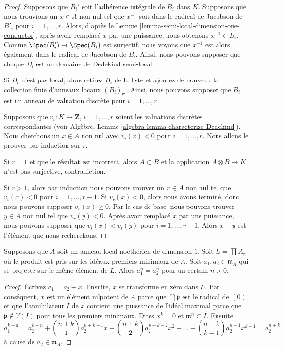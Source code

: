 \begin{proof}
Supposons que $B_i'$ soit l'adhérence intégrale de $B_i$ dans $K$.
Supposons que nous trouvions un $x \in A$ non nul tel que $x^{-1}$ soit
dans le radical de Jacobson de $B'_i$ pour $i = 1, \ldots, r$. Alors,
d'après le Lemme \ref{lemma-semi-local-dimension-one-conductor}, après
avoir remplacé $x$ par une puissance, nous obtenons $x^{-1} \in B_i$.
Comme $\Spec(B'_i) \to \Spec(B_i)$ est surjectif, nous voyons que
$x^{-1}$ est alors également dans le radical de Jacobson de $B_i$. Ainsi,
nous pouvons supposer que chaque $B_i$ est un domaine de Dedekind semi-local.

\medskip\noindent
Si $B_i$ n'est pas local, alors retirez $B_i$ de la liste
et ajoutez de nouveau la collection finie d'anneaux locaux
$(B_i)_\mathfrak m$. Ainsi, nous pouvons supposer que $B_i$
est un anneau de valuation discrète pour $i = 1, \ldots, r$.

\medskip\noindent
Supposons que $v_i : K \to \mathbf{Z}$, $i = 1, \ldots, r$
soient les valuations discrètes correspondantes (voir
Algèbre, Lemme \ref{algebra-lemma-characterize-Dedekind}).
Nous cherchons un $x \in A$ non nul avec $v_i(x) < 0$ pour $i
= 1, \ldots, r$. Nous allons le prouver par induction sur $r$.

\medskip\noindent
Si $r = 1$ et que le résultat est incorrect, alors $A \subset B$ et la
application $A \otimes B \to K$ n'est pas surjective, contradiction.

\medskip\noindent
Si $r > 1$, alors par induction nous pouvons trouver un $x \in A$ non nul
tel que $v_i(x) < 0$ pour $i = 1, \ldots, r - 1$. Si $v_r(x) < 0$, alors nous
avons terminé, donc nous pouvons supposer $v_r(x) \geq 0$. Par le cas de
base, nous pouvons trouver $y \in A$ non nul tel que $v_r(y) < 0$. Après avoir
remplacé $x$ par une puissance, nous pouvons supposer que $v_i(x) < v_i(y)$
pour $i = 1, \ldots, r - 1$. Alors $x + y$ est l'élément que nous recherchons.
\end{proof}

\begin{lemma}
\label{lemma-power-equal}
Supposons que $A$ soit un anneau local noethérien de
dimension $1$. Soit $L = \prod A_\mathfrak p$ où le
produit est pris sur les idéaux premiers minimaux de $A$.
Soit $a_1, a_2 \in \mathfrak m_A$ qui se projette sur le même
élément de $L$. Alors $a_1^n = a_2^n$ pour un certain $n > 0$.
\end{lemma}

\begin{proof}
Écrivez $a_1 = a_2 + x$. Ensuite, $x$ se transforme en zéro
dans $L$. Par conséquent, $x$ est un élément nilpotent de $A$
parce que $\bigcap \mathfrak p$ est le radical de $(0)$ et que
l’annihilateur $I$ de $x$ contient une puissance de l’idéal
maximal parce que $\mathfrak p \not \in V(I)$ pour tous les
premiers minimaux. Dites $x^k = 0$ et $\mathfrak m^n \subset I$. Ensuite
$$
a_1^{k + n} = a_2^{k + n} + {n + k \choose 1} a_2^{n + k - 1} x +
{n + k \choose 2} a_2^{n + k - 2} x^2 + \ldots +
{n + k \choose k - 1} a_2^{n + 1} x^{k - 1} = a_2^{n + k}
$$
à cause de $a_2 \in \mathfrak m_A$.
\end{proof}

